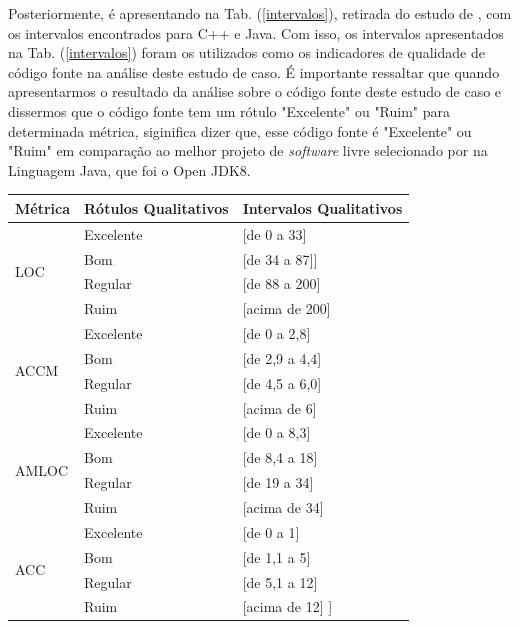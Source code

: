 Posteriormente, é apresentando na Tab. (\ref{intervalos}), retirada do
estudo de , com os intervalos encontrados para C++ e Java. Com isso, os intervalos apresentados na Tab. (\ref{intervalos}) foram os utilizados como os indicadores
de qualidade de código fonte na análise deste estudo de caso. É importante ressaltar que quando apresentarmos o resultado da análise sobre o código fonte deste estudo de caso e dissermos que o código fonte tem um rótulo "Excelente" ou "Ruim" para determinada métrica, siginifica dizer que, esse código fonte é "Excelente" ou "Ruim" em comparação ao melhor projeto de \textit{software} livre selecionado por  na Linguagem Java, que foi o Open JDK8.


	
\begin{longtable}{|l|l|l|}
		\hline
		
		\textbf{Métrica} & \textbf{Rótulos Qualitativos} &  \textbf{Intervalos Qualitativos}  \\ \hline


		 \multirow{4}{*}{LOC} 
		 & Excelente & [de 0 a 33]  \\
		 & Bom & [de 34 a 87]] \\
		 & Regular & [de 88 a 200]  \\
		 & Ruim & [acima de 200] \\ \hline

		 \multirow{4}{*}{ACCM} 
		 & Excelente & [de 0 a 2,8]  \\
		 & Bom & [de 2,9 a 4,4]  \\
		 & Regular & [de 4,5 a 6,0]  \\
		 & Ruim & [acima de 6]  \\ \hline


		 \multirow{4}{*}{AMLOC} 
		 & Excelente & [de 0 a 8,3]  \\
		 & Bom & [de 8,4 a 18]  \\
		 & Regular & [de 19 a 34]  \\
		 & Ruim & [acima de 34]  \\ \hline


		 \multirow{4}{*}{ACC} 
		 & Excelente & [de 0 a 1] \\
		 & Bom & [de 1,1 a 5]  \\
		 & Regular & [de 5,1 a 12] \\
		 & Ruim & [acima de 12] ] \\ \hline



\end{longtable}

